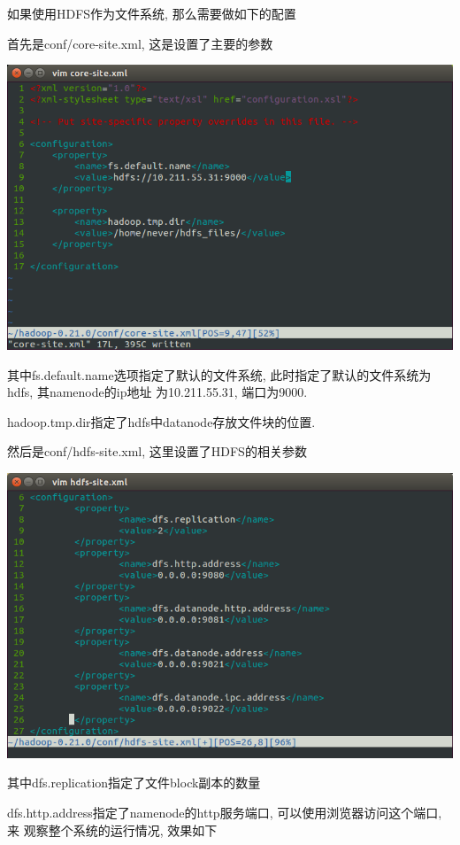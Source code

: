 如果使用HDFS作为文件系统, 那么需要做如下的配置

首先是conf/core-site.xml, 这是设置了{\Hadoop}主要的参数

\includegraphics[width=\textwidth]{image/env/cr9.png}

其中fs.default.name选项指定了默认的文件系统, 此时指定了默认的文件系统为hdfs, 其namenode的ip地址
为10.211.55.31, 端口为9000.

hadoop.tmp.dir指定了hdfs中datanode存放文件块的位置.

然后是conf/hdfs-site.xml, 这里设置了HDFS的相关参数

\includegraphics[width=\textwidth]{image/env/cr10.png}

其中dfs.replication指定了文件block副本的数量

dfs.http.address指定了namenode的http服务端口, 可以使用浏览器访问这个端口, 来
观察整个系统的运行情况, 效果如下

